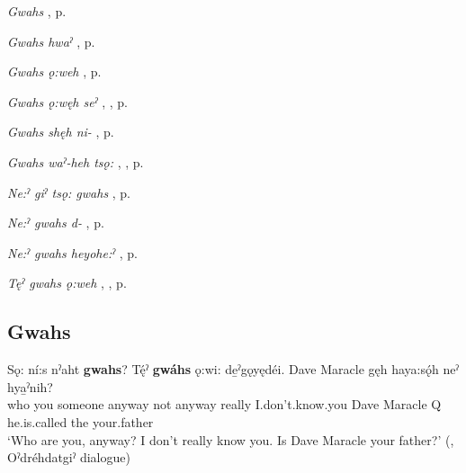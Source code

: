 \begin{CayugaRelated}
\item \textit{Gwahs} , p. \pageref{p:[gwahs] ‘anyway’}\\
\item \textit{Gwahs hwaˀ} , p. \pageref{p:[gwahs hwaˀ]}\\
\item \textit{Gwahs ǫ:weh} , p. \pageref{p:[gwahs ǫ:weh]}\\
\item \textit{Gwahs ǫ:węh seˀ} , , p. \pageref{p:[gwahs ǫ:węh seˀ]}\\
\item \textit{Gwahs shęh ni-} , p. \pageref{p:[gwahs shęh ni-]}\\
\item \textit{Gwahs waˀ-heh tsǫ:} , , p. \pageref{p:[gwahs waˀ-heh tsǫ:]}\\
\item \textit{Ne:ˀ giˀ tsǫ: gwahs} , p. \pageref{p:[ne:ˀ giˀ tsǫ: gwahs]}\\
\item \textit{Ne:ˀ gwahs d-} , p. \pageref{p:[ne:ˀ gwahs d-]}\\
\item \textit{Ne:ˀ gwahs heyohe:ˀ} , p. \pageref{p:[ne:ˀ gwahs heyohe:ˀ]}\\
\item \textit{Tęˀ gwahs ǫ:weh} , , p. \pageref{p:[tęˀ gwahs ǫ:weh]}
\end{CayugaRelated}


\subsection*{\textbf{Gwahs} } \label{p:[gwahs] ‘anyway’}

\ea
\label{ex:gpar102}
\gll Sǫ: ní:s nˀaht \textbf{gwahs}? Tę́ˀ \textbf{gwáhs} ǫ:wi: de̱ˀgǫyędéi. Dave Maracle gęh haya:sǫ́h neˀ hya̱ˀnih?\\
who you someone anyway not anyway really I.don’t.know.you Dave Maracle Q he.is.called the your.father\\
\glt ‘Who are you, anyway? I don’t really know you. Is Dave Maracle your father?’ (\cite[339]{mithun_watewayestanih_1984}, Oˀdréhdatgiˀ dialogue)
\z



